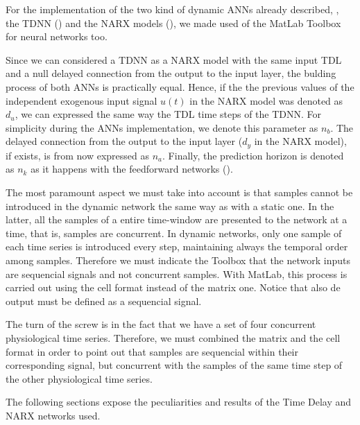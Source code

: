 
\label{sec:application:tdnn}

For the implementation of the two kind of dynamic ANNs already described, 
\ie, the TDNN () and the NARX models (), 
we made used of the MatLab Toolbox for neural networks too. 

Since we can considered a TDNN as a NARX model with the same input TDL 
and a null delayed connection from the output to the input layer, 
the bulding process of both ANNs is practically equal. Hence, if the the previous values of the independent exogenous input signal $u(t)$ in the NARX model was denoted as $d_{u}$, we can expressed the same way the TDL time steps of the TDNN. For simplicity during the ANNs implementation, we denote this parameter as $n_{b}$. The delayed connection from the output to the input layer ($d_{y}$ in the NARX model), if exists, is from now expressed as $n_{a}$. 
Finally, the prediction horizon is denoted as $n_{k}$ as it happens with the feedforward networks ().

The most paramount aspect we must take into account is that samples cannot be introduced in the dynamic network the same way as with a static one. 
In the latter, all the samples of a entire time-window are presented to the network at a time, that is, samples are concurrent. 
In dynamic networks, only one sample of each time series is introduced every step, maintaining always the temporal order among samples. Therefore we must indicate the Toolbox that the network inputs are sequencial signals and not concurrent samples. With MatLab, this process is carried out using the cell format instead of the matrix one. Notice that also de output must be defined as a sequencial signal.

The turn of the screw is in the fact that we have a set of four concurrent physiological time series. Therefore, we must combined the matrix and the cell format in order to point out that samples are sequencial within their corresponding signal, but concurrent with the samples of the same time step of the other physiological time series.

The following sections expose the peculiarities and results of the Time Delay and NARX networks used.






